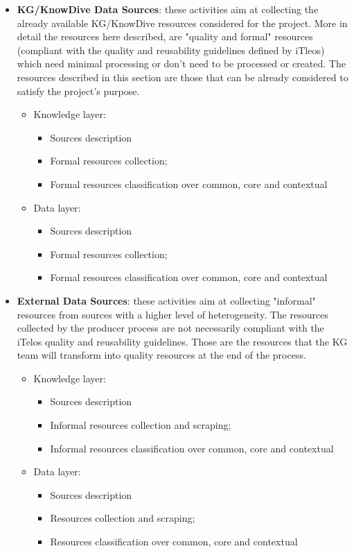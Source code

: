 \begin{itemize}
    \item \textbf{KG/KnowDive Data Sources}: these activities aim at collecting the already available KG/KnowDive resources considered for the project. More in detail the resources here described, are "quality and formal" resources (compliant with the quality and reusability guidelines defined by iTleos) which need minimal processing or don't need to be processed or created. The resources described in this section are those that can be already considered to satisfy the project's purpose.
    \begin{itemize}
        \item Knowledge layer:
        \begin{itemize}
            \item Sources description
            \item Formal resources collection;
            \item Formal resources classification over common, core and contextual
        \end{itemize}
        \item Data layer:
        \begin{itemize}
            \item Sources description
            \item Formal resources collection;
            \item Formal resources classification over common, core and contextual
        \end{itemize}
    \end{itemize}

    \item \textbf{External Data Sources}: these activities aim at collecting "informal" resources from sources with a higher level of heterogeneity. The resources collected by the producer process are not necessarily compliant with the iTelos quality and reusability guidelines. Those are the resources that the KG team will transform into quality resources at the end of the process.
    \begin{itemize}
        \item Knowledge layer:
        \begin{itemize}
            \item Sources description
            \item Informal resources collection and scraping;
            \item Informal resources classification over common, core and contextual
        \end{itemize}
        \item Data layer:
        \begin{itemize}
            \item Sources description
            \item Resources collection and scraping;
            \item Resources classification over common, core and contextual
        \end{itemize}
    \end{itemize}
\end{itemize}

